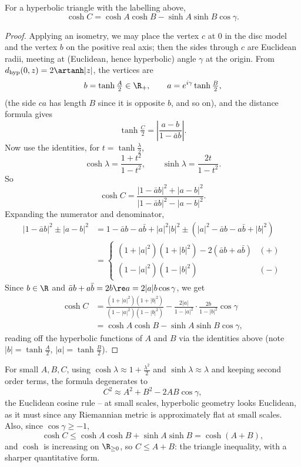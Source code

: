 \begin{proposition}
    For a hyperbolic triangle with the labelling above,
    $$
    \cosh C = \cosh A \cosh B - \sinh A \sinh B \cos \gamma.
    $$
\end{proposition}
\begin{proof}
    Applying an isometry, we may place the vertex $c$ at $0$ in the disc model and the vertex $b$ on the positive real axis; then the sides through $c$ are Euclidean radii, meeting at (Euclidean, hence hyperbolic) angle $\gamma$ at the origin. From $d_{\mathrm{hyp}}(0, z) = 2\artanh|z|$, the vertices are
    $$
    b = \tanh\tfrac{A}{2} \in \R_+, \qquad a = e^{i\gamma}\tanh\tfrac{B}{2},
    $$
    (the side $ca$ has length $B$ since it is opposite $b$, and so on), and the distance formula gives
    $$
    \tanh \tfrac{C}{2} = \left|\frac{a - b}{1 - \bar a b}\right|.
    $$
    Now use the identities, for $t = \tanh\frac{\lambda}{2}$,
    $$
    \cosh \lambda = \frac{1 + t^2}{1 - t^2}, \qquad \sinh \lambda = \frac{2t}{1 - t^2}.
    $$
    So
    $$
    \cosh C = \frac{|1 - \bar a b|^2 + |a - b|^2}{|1 - \bar a b|^2 - |a - b|^2}.
    $$
    Expanding the numerator and denominator,
    \begin{align*}
        |1 - \bar a b|^2 \pm |a - b|^2 &= 1 - \bar a b - a \bar b + |a|^2 |b|^2 \pm \left(|a|^2 - \bar a b - a \bar b + |b|^2\right) \\
        &= \begin{cases}
            (1 + |a|^2)(1 + |b|^2) - 2(\bar a b + a \bar b) & (+)\\
            (1 - |a|^2)(1 - |b|^2) & (-)
        \end{cases}
    \end{align*}
    Since $b \in \R$ and $\bar a b + a \bar b = 2 b \re a = 2 |a| b \cos\gamma$, we get
    \begin{align*}
    \cosh C &= \frac{(1 + |a|^2)(1 + |b|^2)}{(1 - |a|^2)(1 - |b|^2)} - \frac{2|a|}{1 - |a|^2}\cdot\frac{2 b}{1 - |b|^2}\cos\gamma \\
    &= \cosh A \cosh B - \sinh A \sinh B \cos\gamma,
    \end{align*}
    reading off the hyperbolic functions of $A$ and $B$ via the identities above (note $|b| = \tanh\frac{A}{2}$, $|a| = \tanh\frac{B}{2}$).
\end{proof}

\begin{remark}
    For small $A, B, C$, using $\cosh \lambda \approx 1 + \frac{\lambda^2}{2}$ and $\sinh\lambda \approx \lambda$ and keeping second order terms, the formula degenerates to
    $$
    C^2 \approx A^2 + B^2 - 2AB\cos\gamma,
    $$
    the Euclidean cosine rule -- at small scales, hyperbolic geometry looks Euclidean, as it must since any Riemannian metric is approximately flat at small scales. Also, since $\cos \gamma \geq -1$,
    $$
    \cosh C \leq \cosh A \cosh B + \sinh A \sinh B = \cosh(A + B),
    $$
    and $\cosh$ is increasing on $\R_{\geq 0}$, so $C \leq A + B$: the triangle inequality, with a sharper quantitative form.
\end{remark}

